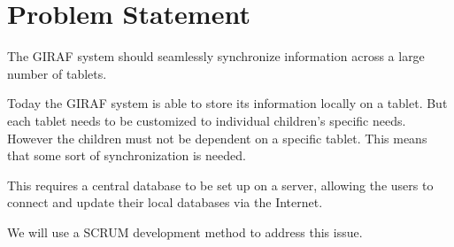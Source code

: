 \section{Problem Statement}
The GIRAF system should seamlessly synchronize information across a large number of tablets.

Today the GIRAF system is able to store its information locally on a tablet. But each tablet needs to be customized to individual children's specific needs. However the children must not be dependent on a specific tablet. This means that some sort of synchronization is needed.

This requires a central database to be set up on a server, allowing the users to connect and update their local databases via the Internet. 

We will use a SCRUM development method to address this issue.